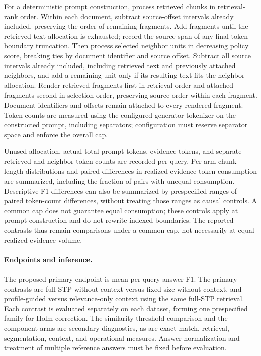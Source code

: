 \documentclass[10pt]{article}
\begin{document}
For a deterministic prompt construction, process retrieved chunks in retrieval-rank order. Within each document, subtract source-offset intervals already included, preserving the order of remaining fragments. Add fragments until the retrieved-text allocation is exhausted; record the source span of any final token-boundary truncation. Then process selected neighbor units in decreasing policy score, breaking ties by document identifier and source offset. Subtract all source intervals already included, including retrieved text and previously attached neighbors, and add a remaining unit only if its resulting text fits the neighbor allocation. Render retrieved fragments first in retrieval order and attached fragments second in selection order, preserving source order within each fragment. Document identifiers and offsets remain attached to every rendered fragment. Token counts are measured using the configured generator tokenizer on the constructed prompt, including separators; configuration must reserve separator space and enforce the overall cap.

Unused allocation, actual total prompt tokens, evidence tokens, and separate retrieved and neighbor token counts are recorded per query. Per-arm chunk-length distributions and paired differences in realized evidence-token consumption are summarized, including the fraction of pairs with unequal consumption. Descriptive F1 differences can also be summarized by prespecified ranges of paired token-count differences, without treating those ranges as causal controls. A common cap does not guarantee equal consumption; these controls apply at prompt construction and do not rewrite indexed boundaries. The reported contrasts thus remain comparisons under a common cap, not necessarily at equal realized evidence volume.

\paragraph{Endpoints and inference.}
The proposed primary endpoint is mean per-query answer F1. The primary contrasts are full STP without context versus fixed-size without context, and profile-guided versus relevance-only context using the same full-STP retrieval. Each contrast is evaluated separately on each dataset, forming one prespecified family for Holm correction. The similarity-threshold comparison and the component arms are secondary diagnostics, as are exact match, retrieval, segmentation, context, and operational measures. Answer normalization and treatment of multiple reference answers must be fixed before evaluation.
\end{document}
